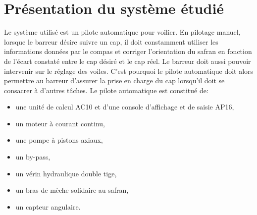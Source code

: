 

\section{Présentation du système étudié}

Le système utilisé est un pilote automatique pour voilier. En pilotage manuel, lorsque le barreur désire suivre un cap, il doit constamment utiliser les informations données par le compas et corriger l'orientation du safran en fonction de l'écart constaté entre le cap désiré et le cap réel. Le barreur doit aussi pouvoir intervenir sur le réglage des voiles. C'est pourquoi le pilote automatique doit alors permettre au barreur d'assurer la prise en charge du cap lorsqu'il doit se consacrer à d'autres tâches. 
Le pilote automatique est constitué de:
\begin{itemize}
 \item une unité de calcul AC10 et d'une console d'affichage et de saisie AP16,
 \item un moteur à courant continu,
 \item une pompe à pistons axiaux,
 \item un by-pass,
 \item un vérin hydraulique double tige,
 \item un bras de mèche solidaire au safran,
 \item un capteur angulaire.
\end{itemize}

